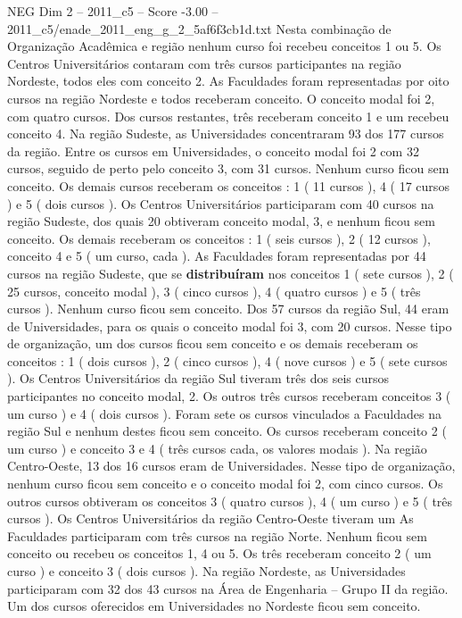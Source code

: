 \begin{textsample}{NEG Dim 2 – 2011\_c5 – Score -3.00 – 2011\_c5/enade\_2011\_eng\_g\_2\_5af6f3cb1d.txt}
Nesta combinação de Organização Acadêmica e região nenhum curso foi recebeu conceitos 1 ou 5.
Os Centros Universitários contaram com três cursos participantes na região Nordeste, todos eles com conceito 2.
As Faculdades foram representadas por oito cursos na região Nordeste e todos receberam conceito.
O conceito modal foi 2, com quatro cursos.
Dos cursos restantes, três receberam conceito 1 e um recebeu conceito 4.
Na região Sudeste, as Universidades concentraram 93 dos 177 cursos da região.
Entre os cursos em Universidades, o conceito modal foi 2 com 32 cursos, seguido de perto pelo conceito 3, com 31 cursos.
Nenhum curso ficou sem conceito.
Os demais cursos receberam os conceitos : 1 ( 11 cursos ), 4 ( 17 cursos ) e 5 ( dois cursos ).
Os Centros Universitários participaram com 40 cursos na região Sudeste, dos quais 20 obtiveram conceito modal, 3, e nenhum ficou sem conceito.
Os demais receberam os conceitos : 1 ( seis cursos ), 2 ( 12 cursos ), conceito 4 e 5 ( um curso, cada ).
As Faculdades foram representadas por 44 cursos na região Sudeste, que se \textbf{distribuíram} nos conceitos 1 ( sete cursos ), 2 ( 25 cursos, conceito modal ), 3 ( cinco cursos ), 4 ( quatro cursos ) e 5 ( três cursos ).
Nenhum curso ficou sem conceito.
Dos 57 cursos da região Sul, 44 eram de Universidades, para os quais o conceito modal foi 3, com 20 cursos.
Nesse tipo de organização, um dos cursos ficou sem conceito e os demais receberam os conceitos : 1 ( dois cursos ), 2 ( cinco cursos ), 4 ( nove cursos ) e 5 ( sete cursos ).
Os Centros Universitários da região Sul tiveram três dos seis cursos participantes no conceito modal, 2.
Os outros três cursos receberam conceitos 3 ( um curso ) e 4 ( dois cursos ).
Foram sete os cursos vinculados a Faculdades na região Sul e nenhum destes ficou sem conceito.
Os cursos receberam conceito 2 ( um curso ) e conceito 3 e 4 ( três cursos cada, os valores modais ).
Na região Centro-Oeste, 13 dos 16 cursos eram de Universidades.
Nesse tipo de organização, nenhum curso ficou sem conceito e o conceito modal foi 2, com cinco cursos.
Os outros cursos obtiveram os conceitos 3 ( quatro cursos ), 4 ( um curso ) e 5 ( três cursos ).
Os Centros Universitários da região Centro-Oeste tiveram um As Faculdades participaram com três cursos na região Norte.
Nenhum ficou sem conceito ou recebeu os conceitos 1, 4 ou 5.
Os três receberam conceito 2 ( um curso ) e conceito 3 ( dois cursos ).
Na região Nordeste, as Universidades participaram com 32 dos 43 cursos na Área de Engenharia – Grupo II da região.
Um dos cursos oferecidos em Universidades no Nordeste ficou sem conceito.

\end{textsample}
